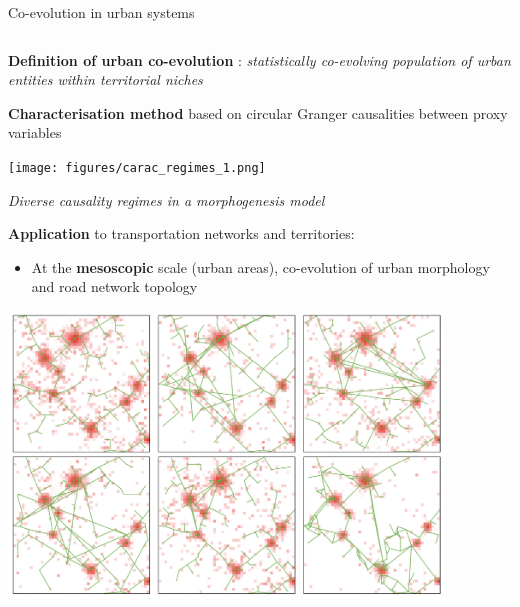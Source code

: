 \documentclass{beamer}
\begin{document}
\begin{frame}{}
\begin{columns}[t]
\begin{column}{.49\textwidth}
\begin{block}{Co-evolution in urban systems}
\begin{columns}[t]
\begin{column}{.95\textwidth}
        
        
       
       \textbf{Definition of urban co-evolution} \cite{raimbault2018caracterisation}: \textit{statistically co-evolving population of urban entities within territorial niches}
       
       \vspace{1cm}
       
       \textbf{Characterisation method} based on circular Granger causalities between proxy variables
       
       \bigskip
       
       \begin{center}
       \texttt{[image: figures/carac\_regimes\_1.png]}
       
       {\small \textit{Diverse causality regimes in a morphogenesis model \cite{raimbault2017identification}}}
       \end{center}
       
       
       \vspace{1cm}
       
       \textbf{Application} to transportation networks and territories:
       
       \bigskip
       
       \begin{itemize}
       		\item At the \textbf{mesoscopic} scale (urban areas), co-evolution of urban morphology and road network topology \cite{raimbault2019urban}
       \end{itemize}
       \begin{center}
       \includegraphics[width=0.87\textwidth]{figures/meso_multimodeling.png}
       

\end{center}
\end{column}
\end{columns}
\end{block}
\end{column}
\end{columns}
\end{frame}
\end{document}

